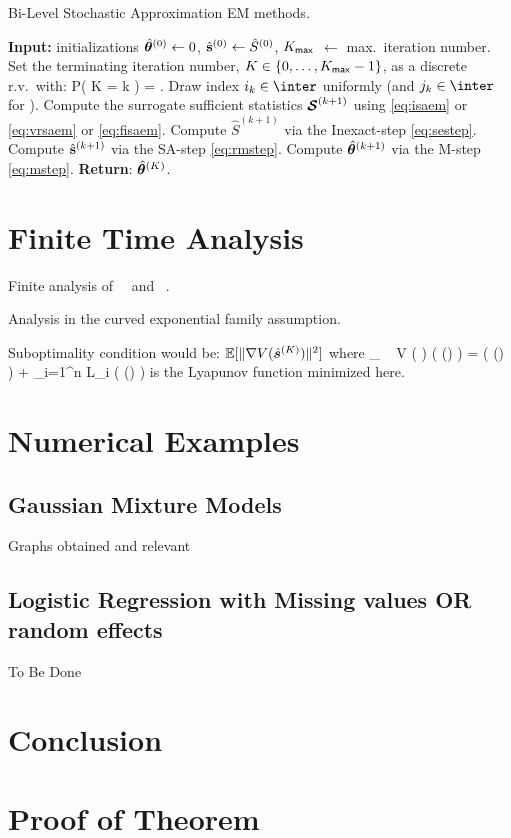 \documentclass[11pt]{article}
\makeatletter
\theoremstyle{t}
\DeclareRobustCommand*\cal{\@fontswitch\relax\mathcal}
\makeatother
\begin{document}
\begin{algorithm}[H]
\caption{Bi-Level Stochastic Approximation EM methods.}\label{alg:sem}
  \begin{algorithmic}[1]
  \STATE \textbf{Input:} initializations $\hat{{\bm{\theta}}}^{(0)} \leftarrow 0$, $\hat{{\mathbf{s}}}^{(0)} \leftarrow \hat{S}^{(0)}$, $K_{\sf max}$ $\leftarrow$ max.~iteration number. \STATE Set the terminating iteration number, $K \in \{0,\dots,K_{\sf max}-1\}$, as a discrete r.v.~with:\vspace{-.1cm}
  \beq \label{eq:random}
   P( K = k ) = .\vspace{-.2cm}
  \eeq
  \STATE Draw index $i_k \in \inter$ uniformly (and $j_k \in \inter$ for \FISAEM).
   \STATE Compute the surrogate sufficient statistics ${\bm{\mathcal{S}}}^{(k+1)}$ using \eqref{eq:isaem} or \eqref{eq:vrsaem} or \eqref{eq:fisaem}.
   \STATE Compute $\hat{S}^{(k+1)}$ via the {\sf Inexact-step} \eqref{eq:sestep}.
      \STATE Compute $\hat{{\mathbf{s}}}^{(k+1)}$ via the {\sf SA-step} \eqref{eq:rmstep}.
   \STATE Compute $\hat{{\bm{\theta}}}^{(k+1)}$ via the {\sf M-step} \eqref{eq:mstep}.
\ENDFOR
\STATE \textbf{Return}: $\hat{{\bm{\theta}}}^{(K)}$.
  \end{algorithmic}
\end{algorithm}


\section{Finite Time Analysis} \label{sec:main}
Finite analysis of \ISAEM\, \SAEMVR\ and \FISAEM\ .

Analysis in the curved exponential family assumption.

Suboptimality condition would be: $\mathbb{E}[ \| {\nabla} V( \hat{\bm s}^{(K)} ) \|^2 ]$ where 
\beq\label{eq:em_sspace}
\min_{ {\bss} \in \Sset }~  V ( {\bss} ) \eqdef \overline\calL( \op(\bss) ) = \Pen (  \op(\bss) ) +  \sum_{i=1}^n {\cal L}_i (  \op(\bss) )
\eeq
is the Lyapunov function minimized here.


\section{Numerical Examples}
\subsection{Gaussian Mixture Models}
Graphs obtained and relevant

\subsection{Logistic Regression with Missing values OR random effects}
To Be Done

\section{Conclusion}


\newpage
\linespread{1.1}
\normalsize




\linespread{1}
\newpage
\appendix
\section{Proof of Theorem}
\end{document}
